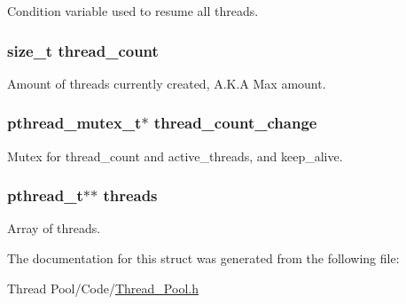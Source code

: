 Condition variable used to resume all threads. 

\hypertarget{struct_thread___pool_a5c106e0816fd7534cf350f800fdb52e0}{}
\subsubsection[{thread\+\_\+count}]{\setlength{\rightskip}{0pt plus 5cm}size\+\_\+t thread\+\_\+count}\label{struct_thread___pool_a5c106e0816fd7534cf350f800fdb52e0}


Amount of threads currently created, A.\+K.\+A Max amount. 

\hypertarget{struct_thread___pool_a701a0c5c72518f8f0f179142c671fe17}{}
\subsubsection[{thread\+\_\+count\+\_\+change}]{\setlength{\rightskip}{0pt plus 5cm}pthread\+\_\+mutex\+\_\+t$\ast$ thread\+\_\+count\+\_\+change}\label{struct_thread___pool_a701a0c5c72518f8f0f179142c671fe17}


Mutex for thread\+\_\+count and active\+\_\+threads, and keep\+\_\+alive. 

\hypertarget{struct_thread___pool_ad525884783bf7870b455a6d9f48b30bb}{}
\subsubsection[{threads}]{\setlength{\rightskip}{0pt plus 5cm}pthread\+\_\+t$\ast$$\ast$ threads}\label{struct_thread___pool_ad525884783bf7870b455a6d9f48b30bb}


Array of threads. 



The documentation for this struct was generated from the following file\+:\begin{DoxyCompactItemize}
\item 
Thread Pool/\+Code/\hyperlink{_thread___pool_8h}{Thread\+\_\+\+Pool.\+h}\end{DoxyCompactItemize}
